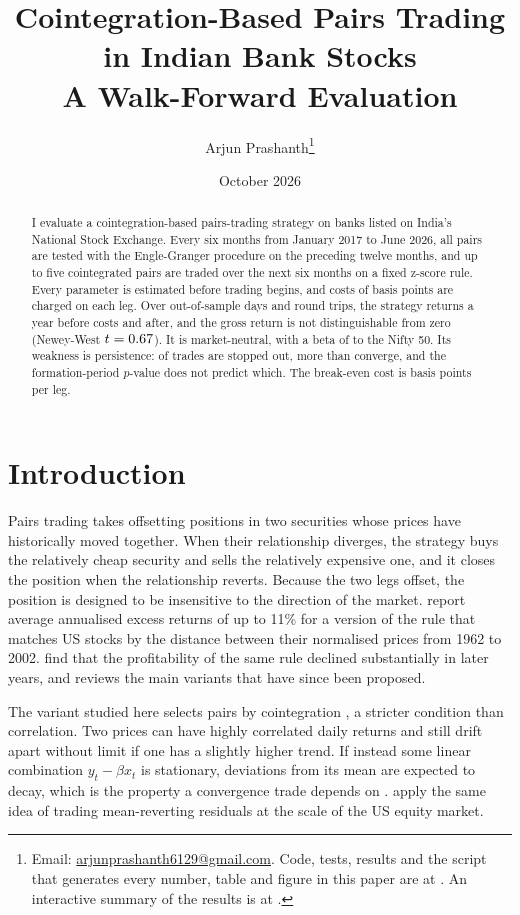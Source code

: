 \documentclass[11pt]{article}
\title{Cointegration-Based Pairs Trading in Indian Bank Stocks\\[0.25em]
  \large\mdseries A Walk-Forward Evaluation}
\author{Arjun Prashanth\thanks{Email: \href{mailto:arjunprashanth6129@gmail.com}{arjunprashanth6129@gmail.com}.
  Code, tests, results and the script that generates every number, table and
  figure in this paper are at
  \weburl{https://github.com/arjunprashanth6129/}{pairs-trading-backtester}. An
  interactive summary of the results is at
  \weburl{https://arjun-quant-projects.vercel.app/}{pairs-trading}.}}
\date{October 2026}
\begin{document}
\maketitle
\thispagestyle{plain}

\begin{abstract}
I evaluate a cointegration-based pairs-trading strategy on \NTraded{} banks listed
on India's National Stock Exchange. Every six months from January 2017 to June
2026, all \NCandidates{} pairs are tested with the Engle-Granger procedure on the
preceding twelve months, and up to five cointegrated pairs are traded over the
next six months on a fixed z-score rule. Every parameter is estimated before
trading begins, and costs of \BpsLeg{} basis points are charged on each leg. Over
\OOSDays{} out-of-sample days and \NTrades{} round trips, the strategy returns
\RetG{} a year before costs and \RetN{} after, and the gross return is not
distinguishable from zero (Newey-West $t = 0.67$). It is market-neutral,
with a beta of \Beta{} to the Nifty 50. Its weakness is persistence: \ShareStopRound{}
of trades are stopped out, more than converge, and the formation-period $p$-value
does not predict which. The break-even cost is \BreakEven{} basis points per leg.
\end{abstract}

\section{Introduction}

Pairs trading takes offsetting positions in two securities whose prices have
historically moved together. When their relationship diverges, the strategy buys
the relatively cheap security and sells the relatively expensive one, and it closes
the position when the relationship reverts. Because the two legs offset, the
position is designed to be insensitive to the direction of the market.
\citet{gatev2006} report average annualised excess returns of up to 11\% for a
version of the rule that matches US stocks by the distance between their
normalised prices from 1962 to 2002. \citet{do2010} find that the profitability of
the same rule declined substantially in later years, and \citet{krauss2017} reviews
the main variants that have since been proposed.

The variant studied here selects pairs by cointegration \citep{engle1987}, a
stricter condition than correlation. Two prices can have highly correlated daily
returns and still drift apart without limit if one has a slightly higher trend. If
instead some linear combination $y_t - \beta x_t$ is stationary, deviations from its
mean are expected to decay, which is the property a convergence trade depends on
\citep{vidyamurthy2004}. \citet{avellaneda2010} apply the same idea of trading
mean-reverting residuals at the scale of the US equity market.
\end{document}
